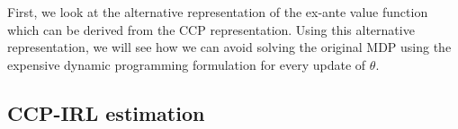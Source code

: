 \documentclass{article}
\renewcommand{\vec}[1]{\mbox{\bm{$#1$}}}
\begin{document}
First, we look at the alternative representation of the ex-ante value function which can be derived from the CCP representation.
Using this alternative representation, we will see how we can avoid solving the original MDP using the expensive dynamic programming formulation for every update of $\theta$.



\subsection{CCP-IRL estimation}
\end{document}
